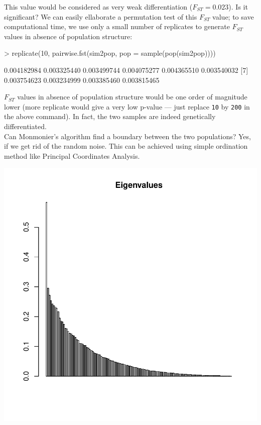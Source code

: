 \documentclass{article}
\begin{document}
\noindent This value would be considered as very weak differentiation ($F_{ST}=0.023$).
Is it significant?
We can easily ellaborate a permutation test of this $F_{ST}$ value; to save computational time, we
use only a small number of replicates to generate $F_{ST}$ values in absence of population structure:
\begin{Schunk}
\begin{Sinput}
> replicate(10, pairwise.fst(sim2pop, pop = sample(pop(sim2pop))))
\end{Sinput}
\begin{Soutput}
 [1] 0.004182984 0.003325440 0.003499744 0.004075277 0.004365510 0.003540032
 [7] 0.003754623 0.003234999 0.003385460 0.003815465
\end{Soutput}
\end{Schunk}
$F_{ST}$ values in absence of population structure would be one order of magnitude lower (more
replicate would give a very low p-value --- just replace \texttt{10} by \texttt{200} in the above command).
In fact, the two samples are indeed genetically differentiated.
\\

Can Monmonier's algorithm find a boundary between the two populations?
Yes, if we get rid of the random noise.
This can be achieved using simple ordination method like Principal Coordinates Analysis.

\begin{Schunk}
\end{Schunk}
\includegraphics{figs/base-mon6}
\end{document}
